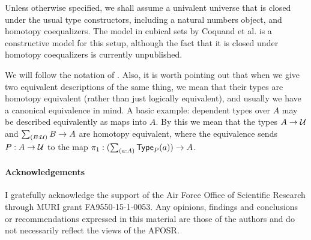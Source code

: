 Unless otherwise specified, we shall assume a univalent universe that is closed
under the usual type constructors, including a natural numbers object, and
homotopy coequalizers. The model in cubical sets by Coquand et al. \cite{BezemCoquandHuber} is a
constructive model for this setup, although the fact that it is closed under
homotopy coequalizers is currently unpublished.

We will follow the notation of \cite{hottbook}.
Also, it is worth pointing out that when we give two equivalent descriptions
of the same thing, we mean that their types are homotopy equivalent
(rather than just logically equivalent), and usually
we have a canonical equivalence in mind. A basic
example: dependent types over $A$ may be described equivalently as maps into
$A$. By this we mean that the types $A\to\mathcal{U}$ and $\sm{B:\UU}B\to A$ are 
homotopy equivalent, where the equivalence sends $P:A\to\mathcal{U}$ to the map
$\pi_1:(\sm{a:A}\P(a))\to A$.

\paragraph{Acknowledgements}
I gratefully acknowledge the support of the Air Force Office of Scientific Research through MURI grant FA9550-15-1-0053. Any opinions, findings and conclusions or recommendations expressed in this material are those of the authors and do not necessarily reflect the views of the AFOSR.
